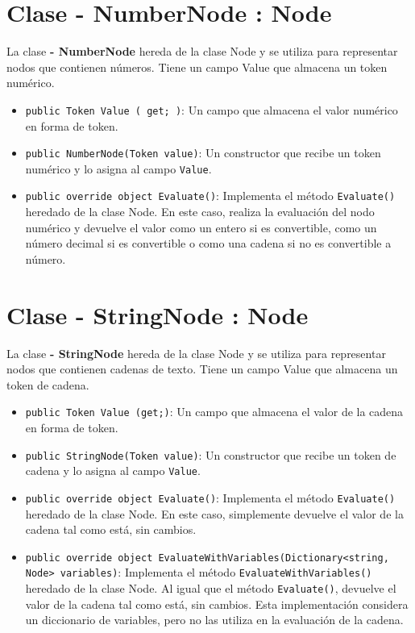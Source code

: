 \documentclass{article}
\newcommand{\subclassed}[1]{\textcolor{classcolor}{\textbf{- #1}}}
\begin{document}
\section{Clase \subclassed{NumberNode} : Node}

La clase \subclassed{NumberNode} hereda de la clase \textcolor{classcolor}{Node} y se utiliza para representar nodos que contienen números. Tiene un campo \textcolor{fieldcolor}{Value} que almacena un token numérico.

\begin{itemize}
    \item \lstinline{public Token Value ( get; )}: Un campo que almacena el valor numérico en forma de token.

    \item \lstinline{public NumberNode(Token value)}: Un constructor que recibe un token numérico y lo asigna al campo \lstinline{Value}.

    \item \lstinline{public override object Evaluate()}: Implementa el método \lstinline{Evaluate()} heredado de la clase \textcolor{classcolor}{Node}. En este caso, realiza la evaluación del nodo numérico y devuelve el valor como un entero si es convertible, como un número decimal si es convertible o como una cadena si no es convertible a número.

\end{itemize}
\section{Clase \subclassed{StringNode} : Node}

La clase \subclassed{StringNode} hereda de la clase \textcolor{classcolor}{Node} y se utiliza para representar nodos que contienen cadenas de texto. Tiene un campo \textcolor{fieldcolor}{Value} que almacena un token de cadena.

\begin{itemize}
    \item \lstinline{public Token Value (get;)}: Un campo que almacena el valor de la cadena en forma de token.

    \item \lstinline{public StringNode(Token value)}: Un constructor que recibe un token de cadena y lo asigna al campo \lstinline{Value}.

    \item \lstinline{public override object Evaluate()}: Implementa el método \lstinline{Evaluate()} heredado de la clase \textcolor{classcolor}{Node}. En este caso, simplemente devuelve el valor de la cadena tal como está, sin cambios.

    \item \lstinline{public override object EvaluateWithVariables(Dictionary<string, Node> variables)}: Implementa el método \lstinline{EvaluateWithVariables()} heredado de la clase \textcolor{classcolor}{Node}. Al igual que el método \lstinline{Evaluate()}, devuelve el valor de la cadena tal como está, sin cambios. Esta implementación considera un diccionario de variables, pero no las utiliza en la evaluación de la cadena.
\end{itemize}
\end{document}
